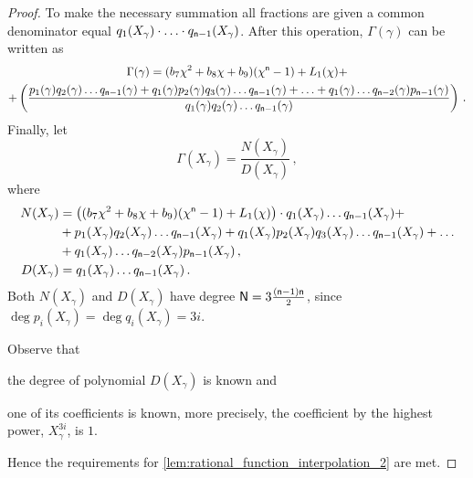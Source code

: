 \documentclass[runningheads]{llncs}
\theoremstyle{definition}
\begin{document}
\begin{proof}
To make the necessary summation all fractions are given a common denominator equal $q_1 (X_\gamma) \cdot \ldots \cdot q_{\mathsf{n} - 1} (X_\gamma)$. After this operation, $\Gamma(\gamma)$ can be written as
\begin{multline*}
  \Gamma(\gamma) = (b_7 \chi^2 + b_8 \chi + b_9) (\chi^{\mathsf{n}} - 1) + L_1 (\chi) + \\
   + \left(\frac{
   p_1(\gamma) q_2(\gamma) \ldots q_{\mathsf{n} - 1}(\gamma) + q_1(\gamma) p_2(\gamma) q_3(\gamma) \ldots q_{\mathsf{n} - 1}(\gamma) + \ldots + q_1(\gamma) \ldots q_{\mathsf{n} - 2}(\gamma) p_{\mathsf{n} - 1}(\gamma)
   }{
   q_1(\gamma) q_2(\gamma) \ldots q_{\mathsf{n} - 1}(\gamma)
   }
  \right)\,.
\end{multline*}
Finally, let 
\[
  \Gamma (X_\gamma) = \frac{N(X_\gamma)}{D(X_\gamma)}\,,
\]
where 
\begin{align*}
  N(X_\gamma) & = \left((b_7 \chi^2 + b_8 \chi + b_9) (\chi^{\mathsf{n}} - 1) + L_1 (\chi)\right) \cdot q_1(X_\gamma) \ldots q_{\mathsf{n} - 1}(X_\gamma) + \\
   & + p_1(X_\gamma) q_2(X_\gamma) \ldots q_{\mathsf{n} - 1}(X_\gamma) + q_1(X_\gamma) p_2(X_\gamma) q_3(X_\gamma) \ldots q_{\mathsf{n} - 1}(X_\gamma) + \ldots \\
   & + q_1(X_\gamma) \ldots q_{\mathsf{n} - 2}(X_\gamma) p_{\mathsf{n} - 1}(X_\gamma)\,,\\
  D(X_\gamma) & = q_1(X_\gamma)  \ldots q_{\mathsf{n} - 1}(X_\gamma)\,.
\end{align*} 
Both $N(X_\gamma)$ and $D(X_\gamma)$ have degree $\mathsf{N} = 3 \frac{(\mathsf{n} - 1) \mathsf{n}}{2}$, since $\deg p_i (X_\gamma) \allowbreak = \deg q_i (X_\gamma) = 3 i$.

Observe that 
\begin{inparaenum}[(i)]
	\item the degree of polynomial $D(X_\gamma)$ is known and 
	\item one of its coefficients is known, more precisely, the coefficient by the highest power, $X_\gamma^{3i}$, is $1$.
\end{inparaenum}
Hence the requirements for \cref{lem:rational_function_interpolation_2} are met.
 

\end{proof}
\end{document}
